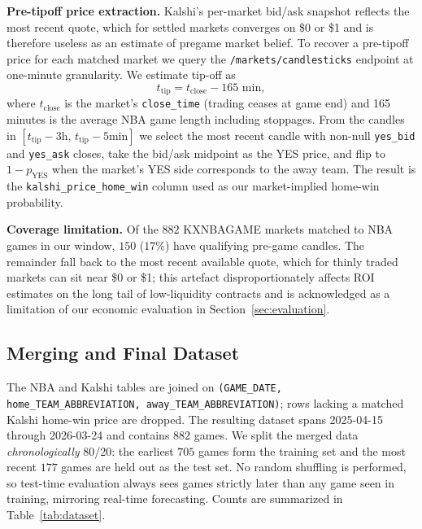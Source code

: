 \textbf{Pre-tipoff price extraction.}
Kalshi's per-market bid/ask snapshot reflects the most recent quote,
which for settled markets converges on \$0 or \$1 and is therefore
useless as an estimate of pregame market belief. To recover a
pre-tipoff price for each matched market we query the
\texttt{/markets/candlesticks} endpoint at one-minute granularity. We
estimate tip-off as
\[
t_{\text{tip}} = t_{\text{close}} - 165\text{ min},
\]
where $t_{\text{close}}$ is the market's \texttt{close\_time} (trading
ceases at game end) and 165 minutes is the average NBA game length
including stoppages. From the candles in
$[t_{\text{tip}} - 3\text{h},\,t_{\text{tip}} - 5\text{min}]$ we select
the most recent candle with non-null \texttt{yes\_bid} and
\texttt{yes\_ask} closes, take the bid/ask midpoint as the YES price,
and flip to $1 - p_{\text{YES}}$ when the market's YES side
corresponds to the away team. The result is the
\texttt{kalshi\_price\_home\_win} column used as our market-implied
home-win probability.

\textbf{Coverage limitation.}
Of the $882$ KXNBAGAME markets matched to NBA games in our window,
$150$ ($17\%$) have qualifying pre-game candles. The remainder fall
back to the most recent available quote, which for thinly traded
markets can sit near \$0 or \$1; this artefact disproportionately
affects ROI estimates on the long tail of low-liquidity contracts and
is acknowledged as a limitation of our economic evaluation in
Section~\ref{sec:evaluation}.

\subsection{Merging and Final Dataset}

The NBA and Kalshi tables are joined on
\texttt{(GAME\_DATE, home\_TEAM\_ABBREVIATION,
away\_TEAM\_ABBREVIATION)}; rows lacking a matched Kalshi home-win
price are dropped. The resulting dataset spans 2025-04-15 through
2026-03-24 and contains $882$ games. We split the merged data
\emph{chronologically} 80/20: the earliest $705$ games form the
training set and the most recent $177$ games are held out as the test
set. No random shuffling is performed, so test-time evaluation always
sees games strictly later than any game seen in training, mirroring
real-time forecasting. Counts are summarized in Table~\ref{tab:dataset}.

